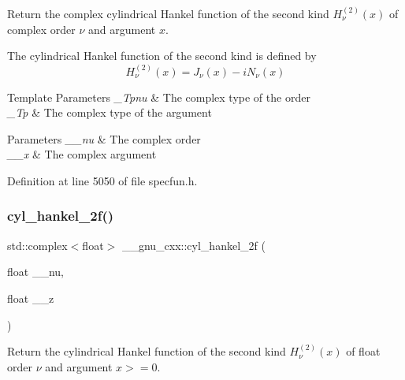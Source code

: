 Return the complex cylindrical Hankel function of the second kind $ H^{(2)}_\nu(x) $ of complex order $ \nu $ and argument $ x $.

The cylindrical Hankel function of the second kind is defined by \[ H^{(2)}_\nu(x) = J_\nu(x) - i N_\nu(x) \]


\begin{DoxyTemplParams}{Template Parameters}
{\em \+\_\+\+Tpnu} & The complex type of the order \\
\hline
{\em \+\_\+\+Tp} & The complex type of the argument \\
\hline
\end{DoxyTemplParams}

\begin{DoxyParams}{Parameters}
{\em \+\_\+\+\_\+nu} & The complex order \\
\hline
{\em \+\_\+\+\_\+x} & The complex argument \\
\hline
\end{DoxyParams}


Definition at line 5050 of file specfun.\+h.

\mbox{\label{group__gnu__math__spec__func_ga2b75361870975c47d57bed71b4064ce7}} 
\subsubsection{\texorpdfstring{cyl\+\_\+hankel\+\_\+2f()}{cyl\_hankel\_2f()}\hspace{0.1cm}{\footnotesize\ttfamily [1/2]}}
{\footnotesize\ttfamily std\+::complex$<$float$>$ \+\_\+\+\_\+gnu\+\_\+cxx\+::cyl\+\_\+hankel\+\_\+2f (\begin{DoxyParamCaption}\item[{float}]{\+\_\+\+\_\+nu,  }\item[{float}]{\+\_\+\+\_\+z }\end{DoxyParamCaption})\hspace{0.3cm}{\ttfamily [inline]}}

Return the cylindrical Hankel function of the second kind $ H^{(2)}_\nu(x) $ of {\ttfamily float} order $ \nu $ and argument $ x >= 0 $.


